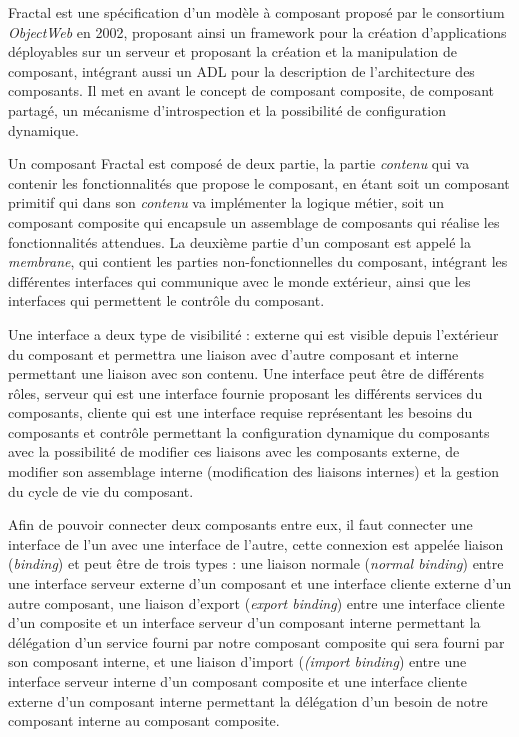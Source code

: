         Fractal \cite{bruneton2006fractal} est une spécification d'un modèle à composant proposé par le consortium \emph{ObjectWeb} en 2002, proposant ainsi un framework pour la création d'applications déployables sur un serveur et proposant la création et la manipulation de composant, intégrant aussi un ADL pour la description de l'architecture des composants. Il met en avant le concept de composant composite, de composant partagé, un mécanisme d'introspection et la possibilité de configuration dynamique. 
        
        Un composant Fractal est composé de deux partie, la partie \emph{contenu} qui va contenir les fonctionnalités que propose le composant, en étant soit un composant primitif qui dans son \emph{contenu} va implémenter la logique métier, soit un composant composite qui encapsule un assemblage de composants qui réalise les fonctionnalités attendues. La deuxième partie d'un composant est appelé la \emph{membrane}, qui contient les parties non-fonctionnelles du composant, intégrant les différentes interfaces qui communique avec le monde extérieur, ainsi que les interfaces qui permettent le contrôle du composant.
        
        Une interface a deux type de visibilité : externe qui est visible depuis l’extérieur du composant et permettra une liaison avec d'autre composant et interne permettant une liaison avec son contenu. Une interface peut être de différents rôles, serveur qui est une interface fournie proposant les différents services du composants, cliente qui est une interface requise représentant les besoins du composants et contrôle permettant la configuration dynamique du composants avec la possibilité de modifier ces liaisons avec les composants externe, de modifier son assemblage interne (modification des liaisons internes) et la gestion du cycle de vie du composant.
        
        Afin de pouvoir connecter deux composants entre eux, il faut connecter une interface de l'un avec une interface de l'autre, cette connexion est appelée liaison (\emph{binding}) et peut être de trois types : une liaison normale (\emph{normal binding}) entre une interface serveur externe d'un composant et une interface cliente externe d'un autre composant, une liaison d'export (\emph{export binding}) entre une interface cliente d'un composite et un interface serveur d'un composant interne permettant la délégation d'un service fourni par notre composant composite qui sera fourni par son composant interne, et une liaison d'import (\emph{(import binding}) entre une interface serveur interne d'un composant composite et une interface cliente externe d'un composant interne permettant la délégation d'un besoin de notre composant interne au composant composite.
        
